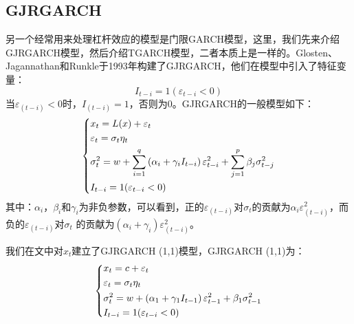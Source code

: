     \subsection{GJRGARCH}
        另一个经常用来处理杠杆效应的模型是门限GARCH模型，这里，我们先来介绍GJRGARCH模型，然后介绍TGARCH模型，二者本质上是一样的。Glosten、Jagannathan和Runkle于1993年构建了GJRGARCH，他们在模型中引入了特征变量：
        \[{I_{t - i}} = 1({\varepsilon _{t - i}} < 0)\]
        当$\varepsilon_{(t-i)}<0$时，$I_{(t-i)}=1$，否则为0。GJRGARCH的一般模型如下：
        \begin{equation*}
        \centering
        \left\{\begin{lgathered}
        {x_t} = L(x) + {\varepsilon _t}\\
        {\varepsilon _t} = {\sigma _t}{\eta _t}\\
        \sigma _t^2 = w + \sum\limits_{i = 1}^q {\left( {{\alpha _i} + {\gamma _i}{I_{t - i}}} \right)\varepsilon _{t - i}^2}  + \sum\limits_{j = 1}^p {{\beta _j}\sigma _{t - j}^2} \\
        {I_{t - i}} = 1({\varepsilon _{t - i}} < 0)
         \end{lgathered} \right.
         \end{equation*}
        其中：$\alpha_i$，$\beta_i$和$\gamma_i$为非负参数，可以看到，正的$\varepsilon_{(t-i)}$对$\sigma_t$的贡献为$\alpha_i \varepsilon_{(t-i)}^2$，而负的$\varepsilon_{(t-i)} $对$\sigma_t$ 的贡献为$\left(\alpha_i +\gamma_i\right)\varepsilon_{(t-i)}^2$。
        \par
        我们在文中对$x_t$建立了GJRGARCH (1,1)模型，GJRGARCH (1,1)为：
        \begin{equation*}
        \centering
        \left\{\begin{lgathered}
        {x_t} = c + {\varepsilon _t}\\
        {\varepsilon _t} = {\sigma _t}{\eta _t}\\
        \sigma _t^2 = w + \left( {{\alpha _1} + {\gamma _1}{I_{t - 1}}} \right)\varepsilon _{t - 1}^2 + {\beta _1}\sigma _{t - 1}^2\\
        {I_{t - i}} = 1({\varepsilon _{t - i}} < 0)
        \end{lgathered} \right.
         \end{equation*}
